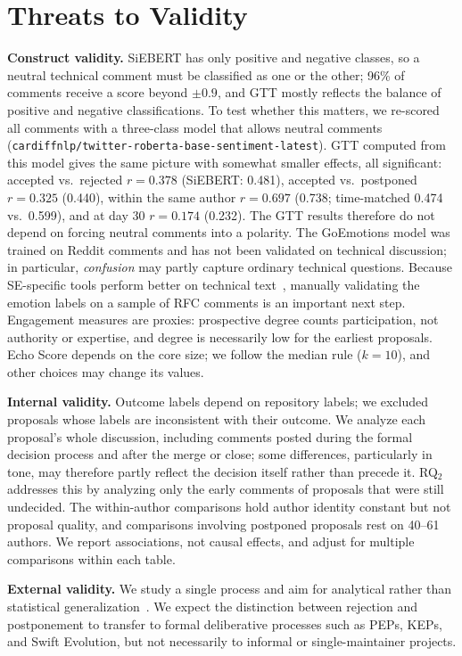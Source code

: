 \documentclass[conference]{IEEEtran}
\begin{document}
\section{Threats to Validity}
\textbf{Construct validity.} SiEBERT has only positive and negative classes, so a neutral technical comment must be classified as one or the other; 96\% of comments receive a score beyond $\pm 0.9$, and GTT mostly reflects the balance of positive and negative classifications. To test whether this matters, we re-scored all comments with a three-class model that allows neutral comments (\texttt{cardiffnlp/twitter-roberta-base-sentiment-latest}). GTT computed from this model gives the same picture with somewhat smaller effects, all significant: accepted vs.\ rejected $r = 0.378$ (SiEBERT: 0.481), accepted vs.\ postponed $r = 0.325$ (0.440), within the same author $r = 0.697$ (0.738; time-matched 0.474 vs.\ 0.599), and at day 30 $r = 0.174$ (0.232). The GTT results therefore do not depend on forcing neutral comments into a polarity. The GoEmotions model was trained on Reddit comments and has not been validated on technical discussion; in particular, \emph{confusion} may partly capture ordinary technical questions. Because SE-specific tools perform better on technical text~\cite{novielli2019sentiment, islam2018sentistrength}, manually validating the emotion labels on a sample of RFC comments is an important next step. Engagement measures are proxies: prospective degree counts participation, not authority or expertise, and degree is necessarily low for the earliest proposals. Echo Score depends on the core size; we follow the median rule ($k = 10$), and other choices may change its values.

\textbf{Internal validity.} Outcome labels depend on repository labels; we excluded proposals whose labels are inconsistent with their outcome. We analyze each proposal's whole discussion, including comments posted during the formal decision process and after the merge or close; some differences, particularly in tone, may therefore partly reflect the decision itself rather than precede it. RQ$_2$ addresses this by analyzing only the early comments of proposals that were still undecided. The within-author comparisons hold author identity constant but not proposal quality, and comparisons involving postponed proposals rest on 40--61 authors. We report associations, not causal effects, and adjust for multiple comparisons within each table.

\textbf{External validity.} We study a single process and aim for analytical rather than statistical generalization~\cite{yin2009case}. We expect the distinction between rejection and postponement to transfer to formal deliberative processes such as PEPs, KEPs, and Swift Evolution, but not necessarily to informal or single-maintainer projects.
\end{document}
